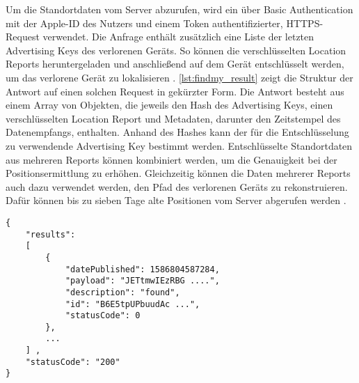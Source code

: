 Um die Standortdaten vom Server abzurufen, wird ein über Basic Authentication mit der Apple-ID des Nutzers und einem Token authentifizierter, HTTPS-Request verwendet.
Die Anfrage enthält zusätzlich eine Liste der letzten Advertising Keys des verlorenen Geräts.
So können die verschlüsselten Location Reports heruntergeladen und anschließend auf dem Gerät entschlüsselt werden, um das verlorene Gerät zu lokalisieren \cite{Heinrich_FindMy}.
\autoref{lst:findmy_result} zeigt die Struktur der Antwort auf einen solchen Request in gekürzter Form.
Die Antwort besteht aus einem Array von Objekten, die jeweils den Hash des Advertising Keys, einen verschlüsselten Location Report und Metadaten, darunter den Zeitstempel des Datenempfangs, enthalten.
Anhand des Hashes kann der für die Entschlüsselung zu verwendende Advertising Key bestimmt werden.
Entschlüsselte Standortdaten aus mehreren Reports können kombiniert werden, um die Genauigkeit bei der Positionsermittlung zu erhöhen.
Gleichzeitig können die Daten mehrerer Reports auch dazu verwendet werden, den Pfad des verlorenen Geräts zu rekonstruieren.
Dafür können bis zu sieben Tage alte Positionen vom Server abgerufen werden \cite{Heinrich_FindMy}.

\begin{lstlisting}[label=lst:findmy_result,caption={Beispielhafte Antwort beim herunterladen von Location Reports\cite{Heinrich_FindMy}.}]
{
    "results": 
    [
        {
            "datePublished": 1586804587284,
            "payload": "JETtmwIEzRBG ....",
            "description": "found",
            "id": "B6E5tpUPbuudAc ...",
            "statusCode": 0
        },
        ...
    ] ,
    "statusCode": "200"
}
\end{lstlisting}